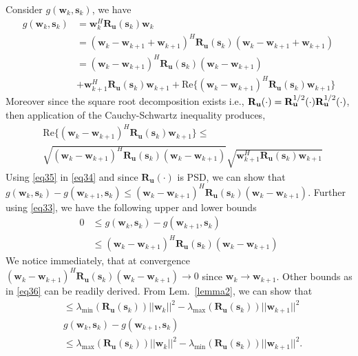 \documentclass[11pt,draftclsnofoot,onecolumn]{IEEEtran}
\theoremstyle{definition}
\theoremstyle{remark}
\begin{document}
Consider $g(\mathbf{w}_k,\mathbf{s}_k)$, we have
\begin{align}\label{eq34}
g(\mathbf{w}_k,\mathbf{s}_k)&=\mathbf{w}_k^H\mathbf{R_u}(\mathbf{s}_k)\mathbf{w}_k \nonumber \\
&=(\mathbf{w}_k-\mathbf{w}_{k+1} +\mathbf{w}_{k+1}  )^H \mathbf{R_u}(\mathbf{s}_k)(\mathbf{w}_k-\mathbf{w}_{k+1}+\mathbf{w}_{k+1} ) \nonumber\\
&=(\mathbf{w}_k-\mathbf{w}_{k+1} )^H \mathbf{R_u}(\mathbf{s}_k)(\mathbf{w}_k-\mathbf{w}_{k+1}) \\
&+ \mathbf{w}_{k+1} ^H \mathbf{R_u}(\mathbf{s}_k)\mathbf{w}_{k+1}+\textrm{Re}\{  (\mathbf{w}_k-\mathbf{w}_{k+1} )^H \mathbf{R_u}( \mathbf{s}_k) \mathbf{w}_{k+1} \} \nonumber
\end{align}
Moreover since the square root decomposition exists i.e., $\mathbf{R_u}( \cdot)=\mathbf{R}_{\bf u}^{1/2}( \cdot) \mathbf{R}_{\bf u}^{1/2}(\cdot)$, then application of the Cauchy-Schwartz inequality produces,
\begin{align} \label{eq35}
&\textrm{Re}\{  (\mathbf{w}_k-\mathbf{w}_{k+1} )^H \mathbf{R_u}( \mathbf{s}_k) \mathbf{w}_{k+1} \} \leq \\
&\sqrt{(\mathbf{w}_k-\mathbf{w}_{k+1} )^H \mathbf{R_u}(\mathbf{s}_k)(\mathbf{w}_k-\mathbf{w}_{k+1}) } \sqrt{\mathbf{w}_{k+1} ^H \mathbf{R_u}(\mathbf{s}_k)\mathbf{w}_{k+1}} \nonumber
\end{align}
Using \eqref{eq35} in \eqref{eq34} and since $\mathbf{R_u}(\cdot)$ is PSD, we can show that 
$
g(\mathbf{w}_k,\mathbf{s}_k)-g(\mathbf{w}_{k+1},\mathbf{s}_k)\leq (\mathbf{w}_k-\mathbf{w}_{k+1} )^H \mathbf{R_u}(\mathbf{s}_k)(\mathbf{w}_k-\mathbf{w}_{k+1})
$. Further using \eqref{eq33}, we have the following upper and lower bounds
\begin{align} \label{eq36}
0&\leq g(\mathbf{w}_k,\mathbf{s}_k)-g(\mathbf{w}_{k+1},\mathbf{s}_k) \nonumber \\
&\leq(\mathbf{w}_k-\mathbf{w}_{k+1} )^H \mathbf{R_u}(\mathbf{s}_k)(\mathbf{w}_k-\mathbf{w}_{k+1})
\end{align}
We notice immediately, that at convergence $(\mathbf{w}_k-\mathbf{w}_{k+1} )^H \mathbf{R_u}(\mathbf{s}_k)(\mathbf{w}_k-\mathbf{w}_{k+1})\rightarrow 0$ since $\mathbf{w}_k\rightarrow\mathbf{w}_{k+1}$. Other bounds as in \eqref{eq36} can be readily derived. From Lem.~\ref{lemma2}, we can show that
\begin{align}\label{eq37}
&\leq \lambda_{\min}(\mathbf{R_u}(\mathbf{s}_k) )|| \mathbf{w}_k||^2-\lambda_{\max}(\mathbf{R_u}(\mathbf{s}_k) )|| \mathbf{w}_{k+1}||^2\nonumber \\
&g(\mathbf{w}_k,\mathbf{s}_k)-g(\mathbf{w}_{k+1},\mathbf{s}_k) \\
&\leq \lambda_{\max}(\mathbf{R_u}(\mathbf{s}_k) )|| \mathbf{w}_k||^2-\lambda_{\min}(\mathbf{R_u}(\mathbf{s}_k) )|| \mathbf{w}_{k+1}||^2 \nonumber.
\end{align}
\end{document}
